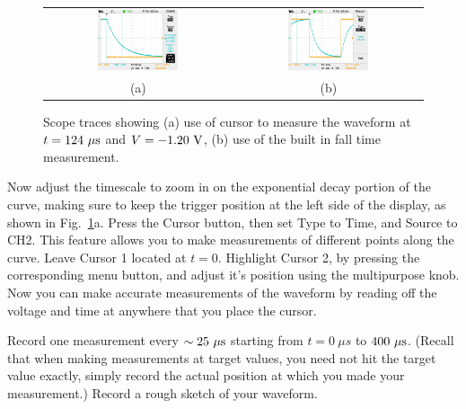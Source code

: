 \begin{figure}[htbp]
\begin{center}
\begin{tabular}{cc}
\includegraphics[width=0.45\textwidth]{figs/labs/transients/rc_cursor.jpg} &
\includegraphics[width=0.45\textwidth]{figs/labs/transients/rc_falltime.jpg} \\
(a) & (b) \\
\end{tabular}
\caption{Scope traces showing (a) use of cursor to measure the waveform at $t=124~\rm \mu s$ and $V=-1.20~\rm V$, (b) use of the built in fall time measurement.}
\label{fig:cursor_falltime}
\end{center}
\end{figure}

Now adjust the timescale to zoom in on the exponential decay portion
of the curve, making sure to keep the trigger position at the left
side of the display, as shown in Fig.~\ref{fig:cursor_falltime}a.
Press the Cursor button, then set Type to Time, and Source to CH2.
This feature allows you to make measurements of different points along
the curve.  Leave Cursor 1 located at $t=0$.  Highlight Cursor 2, by
pressing the corresponding menu button, and adjust it's position using
the multipurpose knob.  Now you can make accurate measurements of the
waveform by reading off the voltage and time at anywhere that you
place the cursor.  

\begin{measurement}
Record one measurement every $\sim 25~\rm \mu s$ starting from
$t=0~\mu s$ to $400~\rm \mu s$.  (Recall that when making measurements
at target values, you need not hit the target value exactly, simply
record the actual position at which you made your measurement.) Record
a rough sketch of your waveform.
\end{measurement}

